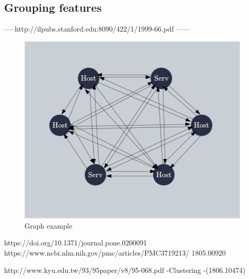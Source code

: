 \documentclass[10pt,a4paper,oneside]{article}
\begin{document}
\subsection{Grouping features}

-----http://ilpubs.stanford.edu:8090/422/1/1999-66.pdf ------ 




\vspace{0.8cm}

\begin{figure}[!h]
\centering
\includegraphics[scale=0.45]{./images/graphe.png}
\caption{Graph example}
\label{graph}
\end{figure}

\vspace{0.8cm}

\begin{multicols}{2}

https://doi.org/10.1371/journal.pone.0200091
https://www.ncbi.nlm.nih.gov/pmc/articles/PMC3719213/
1805.00920


\end{multicols}
http://www.kyu.edu.tw/93/95paper/v8/95-068.pdf
-Clustering
-(1806.10474)
\end{document}

